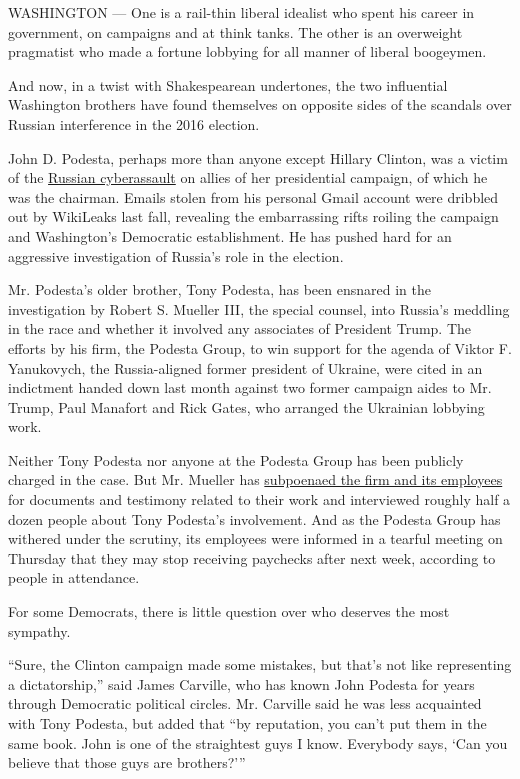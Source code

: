 WASHINGTON --- One is a rail-thin liberal idealist who spent his career
in government, on campaigns and at think tanks. The other is an
overweight pragmatist who made a fortune lobbying for all manner of
liberal boogeymen.

And now, in a twist with Shakespearean undertones, the two influential
Washington brothers have found themselves on opposite sides of the
scandals over Russian interference in the 2016 election.

John D. Podesta, perhaps more than anyone except Hillary Clinton, was a
victim of the
\href{https://www.nytimes.com/2016/12/13/us/politics/russia-hack-election-dnc.html}{Russian
cyberassault} on allies of her presidential campaign, of which he was
the chairman. Emails stolen from his personal Gmail account were
dribbled out by WikiLeaks last fall, revealing the embarrassing rifts
roiling the campaign and Washington's Democratic establishment. He has
pushed hard for an aggressive investigation of Russia's role in the
election.

Mr. Podesta's older brother, Tony Podesta, has been ensnared in the
investigation by Robert S. Mueller III, the special counsel, into
Russia's meddling in the race and whether it involved any associates of
President Trump. The efforts by his firm, the Podesta Group, to win
support for the agenda of Viktor F. Yanukovych, the Russia-aligned
former president of Ukraine, were cited in an indictment handed down
last month against two former campaign aides to Mr. Trump, Paul Manafort
and Rick Gates, who arranged the Ukrainian lobbying work.

Neither Tony Podesta nor anyone at the Podesta Group has been publicly
charged in the case. But Mr. Mueller has
\href{https://www.nytimes.com/2017/09/21/us/politics/law-firm-faces-questions-for-ukraine-work-with-manafort.html}{subpoenaed
the firm and its employees} for documents and testimony related to their
work and interviewed roughly half a dozen people about Tony Podesta's
involvement. And as the Podesta Group has withered under the scrutiny,
its employees were informed in a tearful meeting on Thursday that they
may stop receiving paychecks after next week, according to people in
attendance.

For some Democrats, there is little question over who deserves the most
sympathy.

``Sure, the Clinton campaign made some mistakes, but that's not like
representing a dictatorship,'' said James Carville, who has known John
Podesta for years through Democratic political circles. Mr. Carville
said he was less acquainted with Tony Podesta, but added that ``by
reputation, you can't put them in the same book. John is one of the
straightest guys I know. Everybody says, `Can you believe that those
guys are brothers?'''

